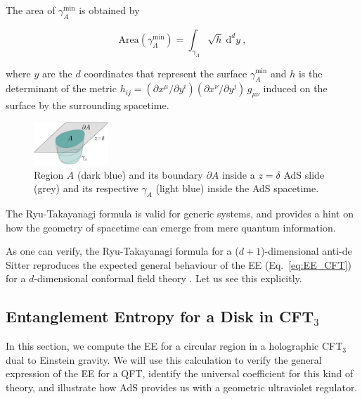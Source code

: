 \documentclass[twocolumn]{revtex4}
\providecommand{\eq}[2]{
    \begin{equation}
        #2
    \label{eq:#1}
    \end{equation}
}
\begin{document}
The area of $\gamma_A^\text{min}$ is obtained by
\eq{EE_RT-area}{
    \text{Area}(\gamma_A^\text{min}) = \int_{\gamma_A} \sqrt{h} \ \mathrm{d}^{d}y \ ,
}
where $y$ are the $d$ coordinates that represent the surface $\gamma_A^\text{min}$ and $h$ is the determinant of the metric $h_{ij} = (\partial x^\mu / \partial y^i) (\partial x^\nu / \partial y^j) \, g_{\mu\nu}$ induced on the surface by the surrounding spacetime.

\begin{figure}
    \centering
    \includegraphics[width=0.25\textwidth]{../imatges/EE_AdS-CFT-D.png}
\caption{Region $A$ (dark blue) and its boundary $\partial A$ inside a $z=\delta$ AdS slide (grey) and its respective $\gamma_A$ (light blue) inside the AdS spacetime.}
\label{fig:EE_AdS-CFT}
\end{figure}

The Ryu-Takayanagi formula is valid for generic systems, and provides a hint on how the geometry of spacetime can emerge from mere quantum information.

As one can verify, the Ryu-Takayanagi formula for a ($d+1$)-dimensional anti-de Sitter reproduces the expected general behaviour of the EE (Eq.~\ref{eq:EE_CFT}) for a $d$-dimensional conformal field theory \cite{ryu_aspects_2006, nishioka_holographic_2009}. Let us see this explicitly.


\subsection{Entanglement Entropy for a Disk in CFT\texorpdfstring{$_3$}{3}} \label{ss:EE-disk}

In this section, we compute the EE for a circular region in a holographic CFT$_3$ dual to Einstein gravity. We will use this calculation to verify the general expression of the EE for a QFT, identify the universal coefficient for this kind of theory, and illustrate how AdS provides us with a geometric ultraviolet regulator.
\end{document}

